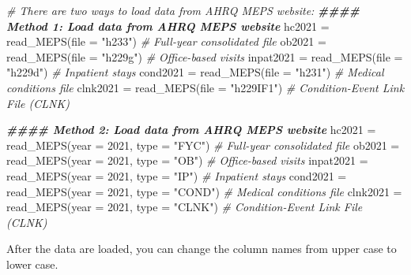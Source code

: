 \documentclass[
]{book}
\newenvironment{Shaded}{\begin{snugshade}}{\end{snugshade}}
\newcommand{\AttributeTok}[1]{\textcolor[rgb]{0.77,0.63,0.00}{#1}}
\newcommand{\CommentTok}[1]{\textcolor[rgb]{0.56,0.35,0.01}{\textit{#1}}}
\newcommand{\DecValTok}[1]{\textcolor[rgb]{0.00,0.00,0.81}{#1}}
\newcommand{\DocumentationTok}[1]{\textcolor[rgb]{0.56,0.35,0.01}{\textbf{\textit{#1}}}}
\newcommand{\FunctionTok}[1]{\textcolor[rgb]{0.00,0.00,0.00}{#1}}
\newcommand{\NormalTok}[1]{#1}
\newcommand{\OtherTok}[1]{\textcolor[rgb]{0.56,0.35,0.01}{#1}}
\newcommand{\StringTok}[1]{\textcolor[rgb]{0.31,0.60,0.02}{#1}}
\begin{document}
\begin{Shaded}
\begin{Highlighting}[]
\CommentTok{\# There are two ways to load data from AHRQ MEPS website:}
\DocumentationTok{\#\#\#\# Method 1: Load data from AHRQ MEPS website}
\NormalTok{hc2021 }\OtherTok{=} \FunctionTok{read\_MEPS}\NormalTok{(}\AttributeTok{file =} \StringTok{"h233"}\NormalTok{) }\CommentTok{\# Full{-}year consolidated file}
\NormalTok{ob2021 }\OtherTok{=} \FunctionTok{read\_MEPS}\NormalTok{(}\AttributeTok{file =} \StringTok{"h229g"}\NormalTok{) }\CommentTok{\# Office{-}based visits}
\NormalTok{inpat2021 }\OtherTok{=} \FunctionTok{read\_MEPS}\NormalTok{(}\AttributeTok{file =} \StringTok{"h229d"}\NormalTok{) }\CommentTok{\# Inpatient stays}
\NormalTok{cond2021 }\OtherTok{=} \FunctionTok{read\_MEPS}\NormalTok{(}\AttributeTok{file =} \StringTok{"h231"}\NormalTok{) }\CommentTok{\# Medical conditions file}
\NormalTok{clnk2021 }\OtherTok{=} \FunctionTok{read\_MEPS}\NormalTok{(}\AttributeTok{file =} \StringTok{"h229IF1"}\NormalTok{) }\CommentTok{\# Condition{-}Event Link File (CLNK)}


\DocumentationTok{\#\#\#\# Method 2: Load data from AHRQ MEPS website}
\NormalTok{hc2021 }\OtherTok{=} \FunctionTok{read\_MEPS}\NormalTok{(}\AttributeTok{year =} \DecValTok{2021}\NormalTok{, }\AttributeTok{type =} \StringTok{"FYC"}\NormalTok{) }\CommentTok{\# Full{-}year consolidated file}
\NormalTok{ob2021 }\OtherTok{=} \FunctionTok{read\_MEPS}\NormalTok{(}\AttributeTok{year =} \DecValTok{2021}\NormalTok{, }\AttributeTok{type =} \StringTok{"OB"}\NormalTok{) }\CommentTok{\# Office{-}based visits}
\NormalTok{inpat2021 }\OtherTok{=} \FunctionTok{read\_MEPS}\NormalTok{(}\AttributeTok{year =} \DecValTok{2021}\NormalTok{, }\AttributeTok{type =} \StringTok{"IP"}\NormalTok{) }\CommentTok{\# Inpatient stays}
\NormalTok{cond2021 }\OtherTok{=} \FunctionTok{read\_MEPS}\NormalTok{(}\AttributeTok{year =} \DecValTok{2021}\NormalTok{, }\AttributeTok{type =} \StringTok{"COND"}\NormalTok{) }\CommentTok{\# Medical conditions file}
\NormalTok{clnk2021 }\OtherTok{=} \FunctionTok{read\_MEPS}\NormalTok{(}\AttributeTok{year =} \DecValTok{2021}\NormalTok{, }\AttributeTok{type =} \StringTok{"CLNK"}\NormalTok{) }\CommentTok{\# Condition{-}Event Link File (CLNK)}
\end{Highlighting}
\end{Shaded}

After the data are loaded, you can change the column names from upper case to lower case.
\end{document}
